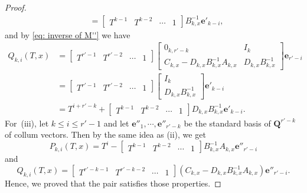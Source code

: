 \documentclass[11pt]{amsart}
\theoremstyle{definition}
\numberwithin{equation}{subsection}
\theoremstyle{plain}
\theoremstyle{plain}
\theoremstyle{plain}
\theoremstyle{plain}
\theoremstyle{plain}
\theoremstyle{plain}
\theoremstyle{plain}
\theoremstyle{plain}
\theoremstyle{plain}
\theoremstyle{plain}
\theoremstyle{plain}
\theoremstyle{plain}
\theoremstyle{definition}
\theoremstyle{definition}
\theoremstyle{definition}
\theoremstyle{remark}
\renewcommand{\(}{\textup{(}}
\renewcommand{\)}{\textup{)}}
\newcommand{\Q}{\mathbf{Q}}
\begin{document}
\begin{proof}
\begin{align*}
            &=
            \begin{bmatrix}
                T^{k-1} & T^{k-2} &\cdots & 1
            \end{bmatrix} B_{k,x}^{-1} \mathbf{e}'_{k-i},
\end{align*}
and by \eqref{eq: inverse of M''} we have
\begin{align*}
Q_{k,i}(T,x)&=
            \begin{bmatrix}
                T^{r'-1}& T^{r'-2} & \cdots & 1
            \end{bmatrix}
            \begin{bmatrix}
                0_{k,r'-k} & I_k\\
                C_{k,x}-D_{k,x}B_{k,x}^{-1}A_{k,x} & D_{k,x}B_{k,x}^{-1}
            \end{bmatrix}\mathbf{e}_{r'-i} \\
            &=
            \begin{bmatrix}
                T^{r'-1}& T^{r'-2} & \cdots & 1
            \end{bmatrix}
            \begin{bmatrix}
                I_k\\
                D_{k,x}B_{k,x}^{-1}
            \end{bmatrix} \mathbf{e}'_{k-i} \\
            &=
            T^{i+r'-k}+
            \begin{bmatrix}
                T^{k-1}& T^{k-2} & \cdots & 1
            \end{bmatrix}
            D_{k,x}B_{k,x}^{-1}
            \mathbf{e}'_{k-i}.
        \end{align*}
For~(iii), let $k\leq i\leq r'-1$ and let $\mathbf{e}''_1,\cdots,\mathbf{e}''_{r'-k}$ be the standard basis of $\Q^{r'-k}$ of collum vectors. Then by the same idea as (ii), we get $$P_{k,i}(T,x)=T^i-
            \begin{bmatrix}
                T^{k-1} & T^{k-2} & \cdots & 1
            \end{bmatrix}
            B_{k,x}^{-1}A_{k,x}
            \mathbf{e}''_{r'-i}$$
and
$$Q_{k,i}(T,x)=\begin{bmatrix}
                T^{r'-k-1} &T^{r'-k-2} & \cdots & 1
            \end{bmatrix}
            (C_{k,x}-D_{k,x}B_{k,x}^{-1}A_{k,x})
            \mathbf{e}''_{r'-i}.$$
Hence, we proved that the pair satisfies those properties.


\end{proof}
\end{document}
